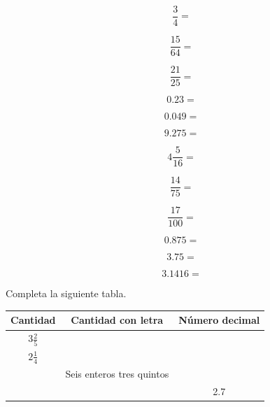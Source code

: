 \documentclass[11pt]{article}
\begin{document}
\begin{multicols}{4}

\begin{equation}    \frac{3}{4} =    \end{equation}

\begin{equation}    \frac{15}{64} =  \end{equation}

\begin{equation}    \frac{21}{25} =  \end{equation}

\begin{equation}    0.23 =          \end{equation}

\begin{equation}    0.049 =         \end{equation}

\begin{equation}    9.275 =         \end{equation}

\begin{equation}    4\frac{5}{16} =  \end{equation}

\begin{equation}    \frac{14}{75} =  \end{equation}

\begin{equation}    \frac{17}{100} = \end{equation}

\begin{equation}    0.875 =         \end{equation}

\begin{equation}    3.75 =          \end{equation}

\begin{equation}    3.1416 =        \end{equation}

\end{multicols}


\newpage

Completa la siguiente tabla.

\vspace {0.5cm}

\begin{center}
\begin{tabular}{|c|c|c|}
\hline
\hline
Cantidad & Cantidad con letra & N\'umero decimal \\
\hline
\hline
$3\frac{2}{5} $ && \\
\hline
$2\frac{1}{4} $ && \\
\hline
& Seis enteros tres quintos & \\
\hline
&& 2.7\\
\hline
\hline
\end{tabular}
\end{center}
\end{document}
